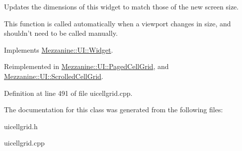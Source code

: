 Updates the dimensions of this widget to match those of the new screen size. 

This function is called automatically when a viewport changes in size, and shouldn't need to be called manually. 

Implements \hyperlink{classMezzanine_1_1UI_1_1Widget_af23f919f2912ac10230953a848c9889c}{Mezzanine::UI::Widget}.



Reimplemented in \hyperlink{classMezzanine_1_1UI_1_1PagedCellGrid_a1ff79a778710a517abb5c55a13b6a273}{Mezzanine::UI::PagedCellGrid}, and \hyperlink{classMezzanine_1_1UI_1_1ScrolledCellGrid_abb580fbe187054004c6f3f0eadec8b7e}{Mezzanine::UI::ScrolledCellGrid}.



Definition at line 491 of file uicellgrid.cpp.



The documentation for this class was generated from the following files:\begin{DoxyCompactItemize}
\item 
uicellgrid.h\item 
uicellgrid.cpp\end{DoxyCompactItemize}
